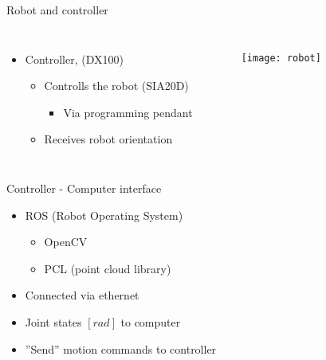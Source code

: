 \begin{frame}{Robot and controller}
\begin{columns}

\begin{itemize}
\item Controller, (DX100)
\begin{itemize}
\item Controlls the robot (SIA20D)
\begin{itemize}
\item Via programming pendant
\end{itemize}
\item Receives robot orientation 
\end{itemize}
\end{itemize}

    \begin{figure}[H]
	\begin{center}
	\texttt{[image: robot]}
	\end{center}
	\end{figure}
    \end{columns}

\end{frame}

\begin{frame}{Controller - Computer interface}


\begin{itemize}
\item ROS (Robot Operating System)
\begin{itemize}
	\item OpenCV
	\item PCL (point cloud library)
\end{itemize}
\item Connected via ethernet
\item Joint states $[rad]$ to computer

\item ''Send'' motion commands to controller
\end{itemize}

\end{frame}


